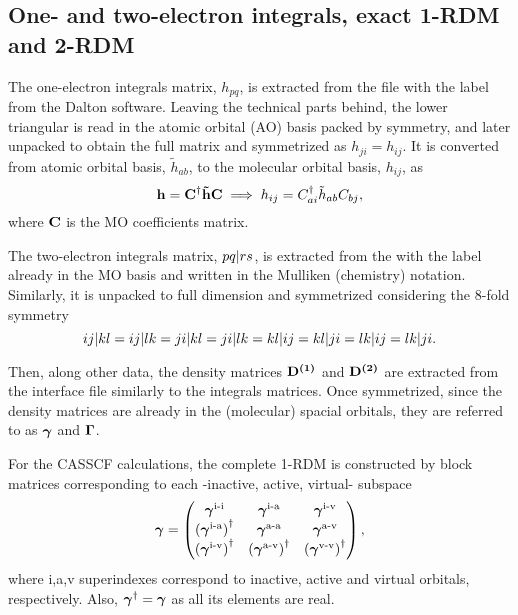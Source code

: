 \subsection{One- and two-electron integrals, exact 1-RDM and 2-RDM}

The one-electron integrals matrix, $h_{pq}$, is extracted from the 
 file with the  label from the Dalton
software.
Leaving the technical parts behind, the lower triangular is read in the atomic
orbital (AO) basis packed by symmetry, and later unpacked to
obtain the full matrix and symmetrized as $h_{ji} = h_{ij}$.
It is converted from atomic orbital basis, $\tilde{h}_{ab}$, to the molecular
orbital basis, $h_{ij}$, as 
\begin{equation}
    \boldsymbol{\mathrm{h}} = \boldsymbol{\mathrm{C}}^{\dagger} \boldsymbol{\mathrm{\tilde{h}}} \boldsymbol{\mathrm{C}}
    \implies
    h_{ij} = C_{ai}^{\dagger} \tilde{h}_{ab} C_{bj},
\end{equation}
where $ \boldsymbol{\mathrm{C}}$ is the MO coefficients matrix.

The two-electron integrals matrix, $ \PBraket{pq | rs}$, is extracted from the
 with the  label already in the MO basis and
written in the Mulliken (chemistry) notation.
Similarly, it is unpacked to full dimension and symmetrized considering the
8-fold symmetry
\begin{equation} \label{eq:spac-int-8fold}
    \PBraket{ij | kl} = 
    \PBraket{ij | lk} = 
    \PBraket{ji | kl} = 
    \PBraket{ji | lk} = 
    \PBraket{kl | ij} = 
    \PBraket{kl | ji} = 
    \PBraket{lk | ij} = 
    \PBraket{lk | ji}
    .
\end{equation}

Then, along other data, the density matrices $\boldsymbol{\mathrm{D^{\left( 1 \right)}}}$ and $\boldsymbol{\mathrm{D^{\left( 2 \right)}}}$ are
extracted from the interface  file similarly to the integrals
matrices.
Once symmetrized, since the density matrices are already in the (molecular)
spacial orbitals, they are referred to as $\boldsymbol{\mathrm{\gamma}}$ and $\boldsymbol{\mathrm{\Gamma}}$.

For the CASSCF calculations, the complete 1-RDM is constructed by block matrices
corresponding to each -inactive, active, virtual- subspace
\begin{equation} \label{eq:complete-cas-1rdm-1}
    \boldsymbol{\mathrm{\gamma}} =
    \begin{pmatrix}
        \boldsymbol{\mathrm{\gamma}}^{\text{i-i}} & \boldsymbol{\mathrm{\gamma}}^{\text{i-a}} & \boldsymbol{\mathrm{\gamma}}^{\text{i-v}} \\
        \left( \boldsymbol{\mathrm{\gamma}}^{\text{i-a}} \right)^{\dagger} & \boldsymbol{\mathrm{\gamma}}^{\text{a-a}} & \boldsymbol{\mathrm{\gamma}}^{\text{a-v}} \\
        \left( \boldsymbol{\mathrm{\gamma}}^{\text{i-v}} \right)^{\dagger} & \left( \boldsymbol{\mathrm{\gamma}}^{\text{a-v}} \right)^{\dagger} & \left( \boldsymbol{\mathrm{\gamma}}^{\text{v-v}} \right)^{\dagger} \\
    \end{pmatrix}
    ,
\end{equation}
where i,a,v superindexes correspond to inactive, active and virtual orbitals,
respectively.
Also, $\boldsymbol{\mathrm{\gamma}}^{\dagger} = \boldsymbol{\mathrm{\gamma}}$ as all its elements
are real.


